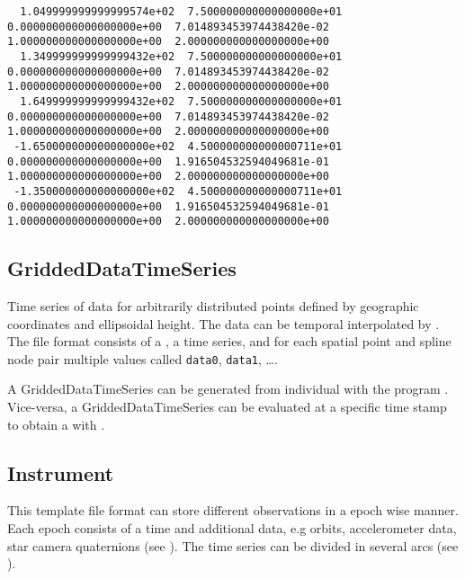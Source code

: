 \begin{verbatim}
  1.049999999999999574e+02  7.500000000000000000e+01  0.000000000000000000e+00  7.014893453974438420e-02  1.000000000000000000e+00  2.000000000000000000e+00
  1.349999999999999432e+02  7.500000000000000000e+01  0.000000000000000000e+00  7.014893453974438420e-02  1.000000000000000000e+00  2.000000000000000000e+00
  1.649999999999999432e+02  7.500000000000000000e+01  0.000000000000000000e+00  7.014893453974438420e-02  1.000000000000000000e+00  2.000000000000000000e+00
 -1.650000000000000000e+02  4.500000000000000711e+01  0.000000000000000000e+00  1.916504532594049681e-01  1.000000000000000000e+00  2.000000000000000000e+00
 -1.350000000000000000e+02  4.500000000000000711e+01  0.000000000000000000e+00  1.916504532594049681e-01  1.000000000000000000e+00  2.000000000000000000e+00
\end{verbatim}



\subsection{GriddedDataTimeSeries}\label{general.fileFormat:griddedDataTimeSeries}
Time series of data for arbitrarily distributed points defined by geographic coordinates and ellipsoidal
height. The data can be temporal interpolated by .
The file format consists of a , a time series, and
for each spatial point and spline node pair multiple values called \verb|data0|, \verb|data1|, \ldots.

A GriddedDataTimeSeries can be generated from individual  with the program
. Vice-versa, a GriddedDataTimeSeries can be evaluated at a
specific time stamp to obtain a  with .


\subsection{Instrument}\label{general.fileFormat:instrument}
This template file format can store different observations in a epoch wise manner. Each epoch consists of a time and
additional data, e.g orbits, accelerometer data, star camera quaternions (see ).
The time series can be divided in several arcs (see ).

